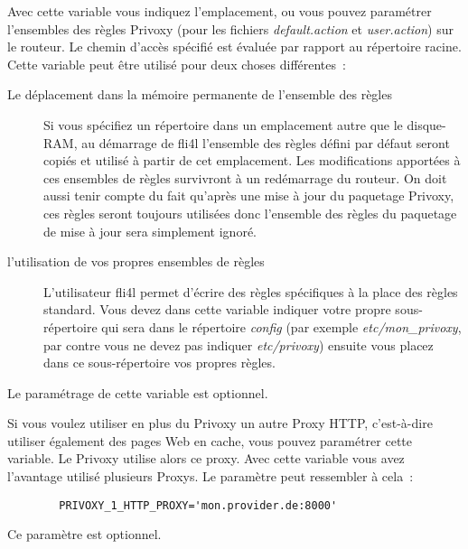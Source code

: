 \begin{description}
 {

  Avec cette variable vous indiquez l'emplacement, ou vous pouvez paramétrer
  l'ensembles des règles Privoxy (pour les fichiers \emph{default.action} et
  \emph{user.action}) sur le routeur. Le chemin d'accès spécifié est évaluée par
  rapport au répertoire racine. Cette variable peut être utilisé pour deux
  choses différentes~:

\begin{description}
  \item [Le déplacement dans la mémoire permanente de l'ensemble des règles]
  Si vous spécifiez un répertoire dans un emplacement autre que le disque-RAM,
  au démarrage de fli4l l'ensemble des règles défini par défaut seront copiés et
  utilisé à partir de cet emplacement. Les modifications apportées à ces
  ensembles de règles survivront à un redémarrage du routeur. On doit aussi
  tenir compte du fait qu'après une mise à jour du paquetage Privoxy, ces règles
  seront toujours utilisées donc l'ensemble des règles du paquetage de mise à
  jour sera simplement ignoré.
  \item [l'utilisation de vos propres ensembles de règles]
  L'utilisateur fli4l permet d'écrire des règles spécifiques à la place des
  règles standard. Vous devez dans cette variable indiquer votre propre
  sous-répertoire qui sera dans le répertoire \emph{config} (par exemple
  \emph{etc/mon\_privoxy}, par contre vous ne devez pas indiquer \emph{etc/privoxy})
  ensuite vous placez dans ce sous-répertoire vos propres règles.
\end{description}

         Le paramétrage de cette variable est optionnel.}


        {Si vous voulez utiliser en plus du Privoxy un autre Proxy HTTP,
        c'est-à-dire utiliser également des pages Web en cache, vous pouvez
        paramétrer cette variable. Le Privoxy utilise alors ce proxy. Avec cette
        variable vous avez l'avantage utilisé plusieurs Proxys. Le paramètre
        peut ressembler à cela~:

\begin{example}
\begin{verbatim}
        PRIVOXY_1_HTTP_PROXY='mon.provider.de:8000'
\end{verbatim}
\end{example}
        Ce paramètre est optionnel.}


\end{description}
